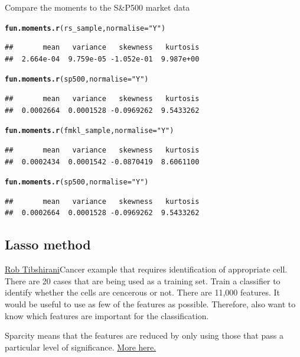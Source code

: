 \documentclass[12pt, a4paper, oneside]{article}\usepackage[]{graphicx}\usepackage[]{color}
\makeatletter
\newcommand{\hlstr}[1]{\textcolor[rgb]{0.192,0.494,0.8}{#1}}%
\newcommand{\hlkwd}[1]{\textcolor[rgb]{0.737,0.353,0.396}{\textbf{#1}}}%
\newenvironment{kframe}{%
 \def\at@end@of@kframe{}%
 \ifinner\ifhmode%
  \def\at@end@of@kframe{\end{minipage}}%
  \begin{minipage}{\columnwidth}%
 \fi\fi%
 \def\FrameCommand##1{\hskip\@totalleftmargin \hskip-\fboxsep
 \colorbox{shadecolor}{##1}\hskip-\fboxsep
     \hskip-\linewidth \hskip-\@totalleftmargin \hskip\columnwidth}%
 \MakeFramed {\advance\hsize-\width
   \@totalleftmargin\z@ \linewidth\hsize
   \@setminipage}}%
 {\par\unskip\endMakeFramed%
 \at@end@of@kframe}
\newenvironment{knitrout}{}{} %
\makeatother
\begin{document}
Compare the moments to the S\&P500 market data
\begin{knitrout}
\color{fgcolor}\begin{kframe}
\begin{alltt}
\hlkwd{fun.moments.r}(rs_sample, normalise = \hlstr{"Y"})
\end{alltt}
\begin{verbatim}
##       mean   variance   skewness   kurtosis 
##  2.664e-04  9.759e-05 -1.052e-01  9.987e+00
\end{verbatim}
\begin{alltt}
\hlkwd{fun.moments.r}(sp500, normalise = \hlstr{"Y"})
\end{alltt}
\begin{verbatim}
##       mean   variance   skewness   kurtosis 
##  0.0002664  0.0001528 -0.0969262  9.5433262
\end{verbatim}
\begin{alltt}
\hlkwd{fun.moments.r}(fmkl_sample, normalise = \hlstr{"Y"})
\end{alltt}
\begin{verbatim}
##       mean   variance   skewness   kurtosis 
##  0.0002434  0.0001542 -0.0870419  8.6061100
\end{verbatim}
\begin{alltt}
\hlkwd{fun.moments.r}(sp500, normalise = \hlstr{"Y"})
\end{alltt}
\begin{verbatim}
##       mean   variance   skewness   kurtosis 
##  0.0002664  0.0001528 -0.0969262  9.5433262
\end{verbatim}
\end{kframe}
\end{knitrout}

\subsection{Lasso method}
\href{http://www.mathtube.org/lecture/video/lasso-brief-review-and-new-significance-test#.U1aODV1sp94.twitter}{Rob Tibshirani}Cancer example that requires identification of appropriate cell. There are 20 cases that are being used as a training set.  Train a classifier to identify whether the cells are cencerous or not.  There are 11,000 features. It would be useful to use as few of the features as possible. Therefore, also want to know which features are important for the classification. 

Sparcity means that the features are reduced by only using those that pass a particular level of significance.  \href{http://statweb.stanford.edu/~tibs/lasso.html}{More here.}
\end{document}
